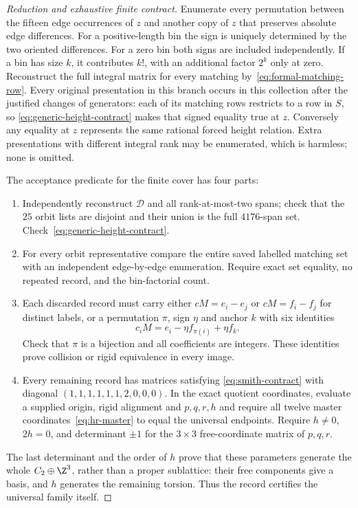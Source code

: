 \begin{proof}[Reduction and exhaustive finite contract]
Enumerate every permutation between the fifteen edge occurrences of
$z$ and another copy of $z$ that preserves absolute edge differences.
For a positive-length bin the sign is uniquely determined by the two
oriented differences. For a zero bin both signs are included independently.
If a bin has size $k$, it contributes $k!$, with an additional factor
$2^k$ only at zero. Reconstruct the full integral matrix for every
matching by~\eqref{eq:formal-matching-row}. Every original presentation
in this branch occurs in this collection after the justified changes of
generators: each of its matching rows restricts to a row in $S$, so
\eqref{eq:generic-height-contract} makes that signed equality true at
$z$. Conversely any equality at $z$ represents the same rational forced
height relation. Extra presentations with different integral rank may
be enumerated, which is harmless; none is omitted.

The acceptance predicate for the finite cover has four parts:
\begin{enumerate}
 \item Independently reconstruct $\mathcal D$ and all rank-at-most-two
 spans; check that the $25$ orbit lists are disjoint and their union is
 the full $4176$-span set. Check~\eqref{eq:generic-height-contract}.
 \item For every orbit representative compare the entire saved labelled
 matching set with an independent edge-by-edge enumeration. Require
 exact set equality, no repeated record, and the bin-factorial count.
 \item Each discarded record must carry either $cM=e_i-e_j$ or
 $cM=f_i-f_j$ for distinct labels, or a permutation $\pi$, sign $\eta$
 and anchor $k$ with six identities
 \[
 c_iM=e_i-\eta f_{\pi(i)}+\eta f_k.
 \]
 Check that $\pi$ is a bijection and all coefficients are integers.
 These identities prove collision or rigid equivalence in every image.
 \item Every remaining record has matrices satisfying
 \eqref{eq:smith-contract} with diagonal
 $(1,1,1,1,1,1,2,0,0,0)$. In the exact quotient coordinates, evaluate
 a supplied origin, rigid alignment and $p,q,r,h$ and require all twelve
 master coordinates~\eqref{eq:hr-master} to equal the universal endpoints.
 Require $h\ne0$, $2h=0$, and determinant $\pm1$ for the $3\times3$
 free-coordinate matrix of $p,q,r$.
\end{enumerate}
The last determinant and the order of $h$ prove that these parameters
generate the whole $C_2\oplus\Z^3$, rather than a proper sublattice:
their free components give a basis, and $h$ generates the remaining
torsion. Thus the record certifies the universal family itself.


\end{proof}
